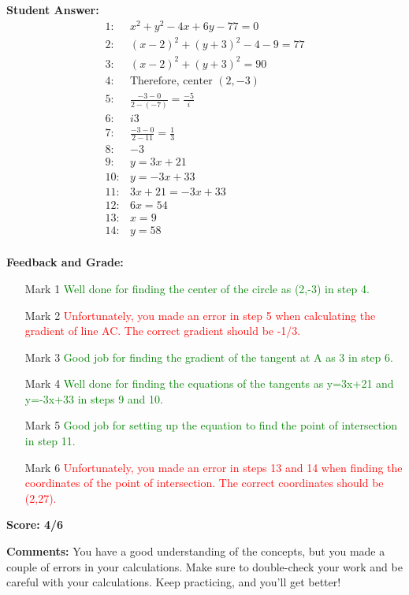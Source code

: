 \documentclass{article}
\begin{document}
\textbf{Student Answer:}
\begin{align*}
1: & x^{2}+y^{2}-4x+6y-77=0 \\
2: & (x-2)^{2}+(y+3)^{2}-4-9=77 \\
3: & (x-2)^{2}+(y+3)^{2}=90 \\
4: & \text{Therefore, center }(2,-3) \\
5: & \frac{-3-0}{2-(-7)}=\frac{-5}{i} \\
6: & i3 \\
7: & \frac{-3-0}{2-11}=\frac{1}{3} \\
8: & -3 \\
9: & y=3x+21 \\
10: & y=-3x+33 \\
11: & 3x+21=-3x+33 \\
12: & 6x=54 \\
13: & x=9 \\
14: & y=58 \\
\end{align*}

\textbf{Feedback and Grade:}
\begin{itemize}
\item[Mark 1] \textcolor{green}{Well done for finding the center of the circle as (2,-3) in step 4.}
\item[Mark 2] \textcolor{red}{Unfortunately, you made an error in step 5 when calculating the gradient of line AC. The correct gradient should be -1/3.}
\item[Mark 3] \textcolor{green}{Good job for finding the gradient of the tangent at A as 3 in step 6.}
\item[Mark 4] \textcolor{green}{Well done for finding the equations of the tangents as y=3x+21 and y=-3x+33 in steps 9 and 10.}
\item[Mark 5] \textcolor{green}{Good job for setting up the equation to find the point of intersection in step 11.}
\item[Mark 6] \textcolor{red}{Unfortunately, you made an error in steps 13 and 14 when finding the coordinates of the point of intersection. The correct coordinates should be (2,27).}
\end{itemize}

\textbf{Score: 4/6}

\textbf{Comments:} You have a good understanding of the concepts, but you made a couple of errors in your calculations. Make sure to double-check your work and be careful with your calculations. Keep practicing, and you'll get better!
\end{document}
